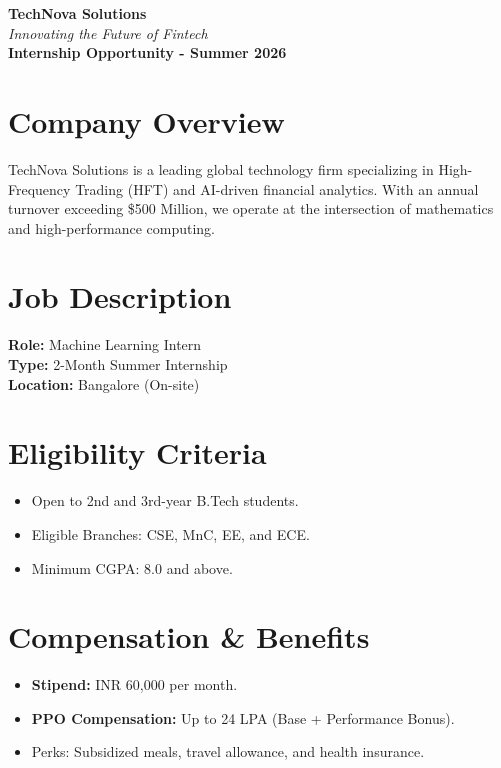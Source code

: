 \documentclass[a4paper,11pt]{article}
\begin{document}
\begin{center}
    {\Huge \textbf{\color{primary} TechNova Solutions}} \\
    \vspace{2mm}
    {\large \textit{Innovating the Future of Fintech}} \\
    \vspace{4mm}
    \textbf{Internship Opportunity - Summer 2026}
\end{center}

\vspace{10mm}

\section{Company Overview}
TechNova Solutions is a leading global technology firm specializing in High-Frequency Trading (HFT) and AI-driven financial analytics. With an annual turnover exceeding \$500 Million, we operate at the intersection of mathematics and high-performance computing.

\vspace{5mm}

\section{Job Description}
\textbf{Role:} Machine Learning Intern \\
\textbf{Type:} 2-Month Summer Internship \\
\textbf{Location:} Bangalore (On-site)

\vspace{5mm}

\section{Eligibility Criteria}
\begin{itemize}[noitemsep]
    \item Open to 2nd and 3rd-year B.Tech students.
    \item Eligible Branches: CSE, MnC, EE, and ECE.
    \item Minimum CGPA: 8.0 and above.
\end{itemize}

\vspace{5mm}

\section{Compensation \& Benefits}
\begin{itemize}[noitemsep]
    \item \textbf{Stipend:} INR 60,000 per month.
    \item \textbf{PPO Compensation:} Up to 24 LPA (Base + Performance Bonus).
    \item Perks: Subsidized meals, travel allowance, and health insurance.
\end{itemize}
\end{document}
